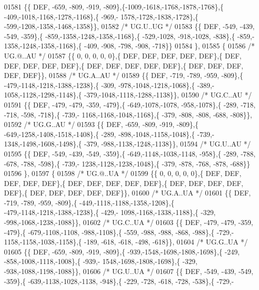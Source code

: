 \begin{DoxyCode}
01581 \{\{  DEF, -659, -809, -919, -809\},\{-1009,-1618,-1768,-1878,-1768\},\{ -409,-1018,-1168,-1278,-1168\},\{ -969,-
      1578,-1728,-1838,-1728\},\{ -599,-1208,-1358,-1468,-1358\}\},
01582 \textcolor{comment}{/* UG.U..UG */}
01583 \{\{  DEF, -549, -439, -549, -359\},\{ -859,-1358,-1248,-1358,-1168\},\{ -529,-1028, -918,-1028, -838\},\{ -859,-
      1358,-1248,-1358,-1168\},\{ -409, -908, -798, -908, -718\}\}
01584 \},
01585 \{
01586 \textcolor{comment}{/* UG.@..AU */}
01587 \{\{    0,    0,    0,    0,    0\},\{  DEF,  DEF,  DEF,  DEF,  DEF\},\{  DEF,  DEF,  DEF,  DEF,  DEF\},\{  DEF,  
      DEF,  DEF,  DEF,  DEF\},\{  DEF,  DEF,  DEF,  DEF,  DEF\}\},
01588 \textcolor{comment}{/* UG.A..AU */}
01589 \{\{  DEF, -719, -789, -959, -809\},\{ -479,-1148,-1218,-1388,-1238\},\{ -309, -978,-1048,-1218,-1068\},\{ -389,-
      1058,-1128,-1298,-1148\},\{ -379,-1048,-1118,-1288,-1138\}\},
01590 \textcolor{comment}{/* UG.C..AU */}
01591 \{\{  DEF, -479, -479, -359, -479\},\{ -649,-1078,-1078, -958,-1078\},\{ -289, -718, -718, -598, -718\},\{ -739,-
      1168,-1168,-1048,-1168\},\{ -379, -808, -808, -688, -808\}\},
01592 \textcolor{comment}{/* UG.G..AU */}
01593 \{\{  DEF, -659, -809, -919, -809\},\{ -649,-1258,-1408,-1518,-1408\},\{ -289, -898,-1048,-1158,-1048\},\{ -739,-
      1348,-1498,-1608,-1498\},\{ -379, -988,-1138,-1248,-1138\}\},
01594 \textcolor{comment}{/* UG.U..AU */}
01595 \{\{  DEF, -549, -439, -549, -359\},\{ -649,-1148,-1038,-1148, -958\},\{ -289, -788, -678, -788, -598\},\{ -739,-
      1238,-1128,-1238,-1048\},\{ -379, -878, -768, -878, -688\}\}
01596 \},
01597 \{
01598 \textcolor{comment}{/* UG.@..UA */}
01599 \{\{    0,    0,    0,    0,    0\},\{  DEF,  DEF,  DEF,  DEF,  DEF\},\{  DEF,  DEF,  DEF,  DEF,  DEF\},\{  DEF,  
      DEF,  DEF,  DEF,  DEF\},\{  DEF,  DEF,  DEF,  DEF,  DEF\}\},
01600 \textcolor{comment}{/* UG.A..UA */}
01601 \{\{  DEF, -719, -789, -959, -809\},\{ -449,-1118,-1188,-1358,-1208\},\{ -479,-1148,-1218,-1388,-1238\},\{ -429,-
      1098,-1168,-1338,-1188\},\{ -329, -998,-1068,-1238,-1088\}\},
01602 \textcolor{comment}{/* UG.C..UA */}
01603 \{\{  DEF, -479, -479, -359, -479\},\{ -679,-1108,-1108, -988,-1108\},\{ -559, -988, -988, -868, -988\},\{ -729,-
      1158,-1158,-1038,-1158\},\{ -189, -618, -618, -498, -618\}\},
01604 \textcolor{comment}{/* UG.G..UA */}
01605 \{\{  DEF, -659, -809, -919, -809\},\{ -939,-1548,-1698,-1808,-1698\},\{ -249, -858,-1008,-1118,-1008\},\{ -939,-
      1548,-1698,-1808,-1698\},\{ -329, -938,-1088,-1198,-1088\}\},
01606 \textcolor{comment}{/* UG.U..UA */}
01607 \{\{  DEF, -549, -439, -549, -359\},\{ -639,-1138,-1028,-1138, -948\},\{ -229, -728, -618, -728, -538\},\{ -729,-

\end{DoxyCode}
